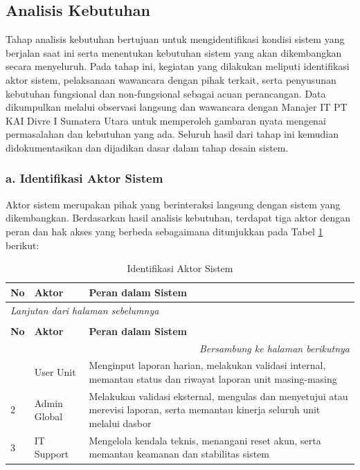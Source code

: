 \subsection{Analisis Kebutuhan} \label{III.AnalisKebutuhan}
Tahap analisis kebutuhan bertujuan untuk mengidentifikasi kondisi sistem yang berjalan saat ini serta menentukan kebutuhan sistem yang akan dikembangkan secara menyeluruh. Pada tahap ini, kegiatan yang dilakukan meliputi identifikasi aktor sistem, pelaksanaan wawancara dengan pihak terkait, serta penyusunan kebutuhan fungsional dan non-fungsional sebagai acuan perancangan. Data dikumpulkan melalui observasi langsung dan wawancara dengan Manajer IT PT KAI Divre I Sumatera Utara untuk memperoleh gambaran nyata mengenai permasalahan dan kebutuhan yang ada. Seluruh hasil dari tahap ini kemudian didokumentasikan dan dijadikan dasar dalam tahap desain sistem. \par

\subsubsection*{a. Identifikasi Aktor Sistem}
Aktor sistem merupakan pihak yang berinteraksi langsung dengan sistem yang dikembangkan. Berdasarkan hasil analisis kebutuhan, terdapat tiga aktor dengan peran dan hak akses yang berbeda sebagaimana ditunjukkan pada Tabel \ref{table:3.aktor} berikut:

\begin{longtable}{|p{}|p{}|p{}|}
    \caption{Identifikasi Aktor Sistem}
    \label{table:3.aktor}\\
    \hline
    \textbf{No} & \textbf{Aktor} & \textbf{Peran dalam Sistem} \\
    \hline
    \endfirsthead
    \multicolumn{3}{l}{\textit{Lanjutan dari halaman sebelumnya}} \\
    \caption[]{Identifikasi Aktor Sistem} \\
    \hline
    \textbf{No} & \textbf{Aktor} & \textbf{Peran dalam Sistem} \\
    \hline
    \endhead
    \hline
    \multicolumn{3}{r}{\textit{Bersambung ke halaman berikutnya}} \\
    \endfoot
    \endlastfoot
    1 & User Unit & Menginput laporan harian, melakukan validasi internal, memantau status dan riwayat laporan unit masing-masing \\
    \hline
    2 & Admin Global & Melakukan validasi eksternal, mengulas dan menyetujui atau merevisi laporan, serta memantau kinerja seluruh unit melalui dasbor \\
    \hline
    3 & IT Support & Mengelola kendala teknis, menangani reset akun, serta memantau keamanan dan stabilitas sistem \\
    \hline
\end{longtable}


